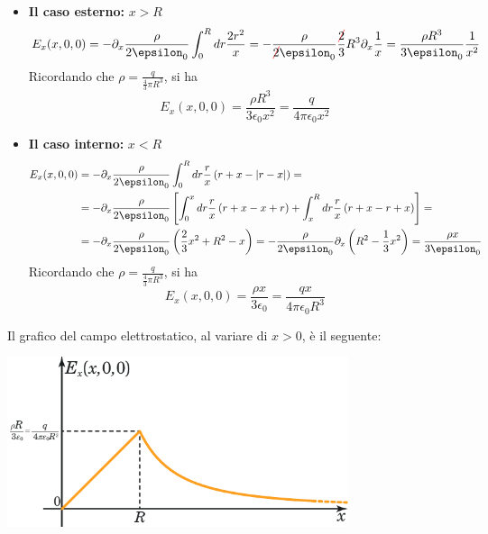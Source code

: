 \begin{itemize}
	\item \textbf{Il caso esterno:} $x>R$
	\begin{equation*}
		E_x(x,0,0)=-\partial_x\frac{\rho}{2\epsilon_0}\int_0^Rdr\frac{2r^2}{x}=-\frac{\rho}{\Ccancel[red]{2}\epsilon_0}\frac{\Ccancel[red]{2}}{3}R^3\partial_x \frac{1}{x}=\frac{\rho R^3}{3\epsilon_0}\frac{1}{x^2}
	\end{equation*}
	Ricordando che $\rho=\frac{q}{\frac{4}{3}\pi R^3}$, si ha
	\begin{equation}
		E_x(x,0,0)=\frac{\rho R^3}{3\epsilon_0x^2}=\frac{q}{4\pi\epsilon_0x^2}
	\end{equation}
	\item \textbf{Il caso interno:} $x<R$
	\begin{align*}
		E_x(x,0,0)&=-\partial_x\frac{\rho}{2\epsilon_0}\int_0^Rdr\frac{r}{x}\left(r+x-\abs{r-x}\right)=\\
		&=-\partial_x\frac{\rho}{2\epsilon_0}\left[\int_0^xdr\frac{r}{x}\left(r+x-x+r\right)+\int_x^Rdr\frac{r}{x}\left(r+x-r+x\right)\right]=\\
		&=-\partial_x\frac{\rho}{2\epsilon_0}\left(\frac{2}{3}x^2+R^2-x\right)=-\frac{\rho}{2\epsilon_0}\partial_x\left(R^2-\frac{1}{3}x^2\right)=\frac{\rho x}{3\epsilon_0}
	\end{align*}
	Ricordando che $\rho=\frac{q}{\frac{4}{3}\pi R^3}$, si ha
	\begin{equation}
		E_x(x,0,0)=\frac{\rho x}{3\epsilon_0}=\frac{qx}{4\pi\epsilon_0R^3}
	\end{equation}
\end{itemize}
Il grafico del campo elettrostatico, al variare di $x>0$, è il seguente:
\begin{center}
	\includegraphics[width=0.75\textwidth]{images/chp1/chp1sferagraf.pdf}
\end{center}